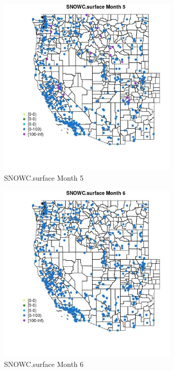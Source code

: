 \begin{figure} 
\centering  
\includegraphics[width=0.77\textwidth]{Code_Outputs/Report_ML_input_PM25_Step4_part_e_de_duplicated_aves_compiled_2019-05-14wNAs_MapObsMo5SNOWCsurface.jpg} 
\caption{\label{fig:Report_ML_input_PM25_Step4_part_e_de_duplicated_aves_compiled_2019-05-14wNAsMapObsMo5SNOWCsurface}SNOWC.surface Month 5} 
\end{figure} 
 

\clearpage 

\begin{figure} 
\centering  
\includegraphics[width=0.77\textwidth]{Code_Outputs/Report_ML_input_PM25_Step4_part_e_de_duplicated_aves_compiled_2019-05-14wNAs_MapObsMo6SNOWCsurface.jpg} 
\caption{\label{fig:Report_ML_input_PM25_Step4_part_e_de_duplicated_aves_compiled_2019-05-14wNAsMapObsMo6SNOWCsurface}SNOWC.surface Month 6} 
\end{figure} 
 

